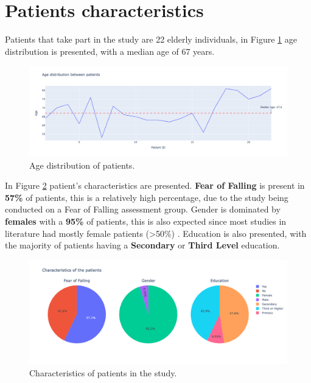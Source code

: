     \section{Patients characteristics}
        Patients that take part in the study are 22 elderly individuals, in Figure \ref{fig:age_distribution} age distribution is presented, with a median age of 67 years. 
        \newpage 
        \begin{figure}[H]
            \centering
            \includegraphics[width=1.0\textwidth]{./resources/plots/patients/age.png}
            \caption{Age distribution of patients.}
            \label{fig:age_distribution}
        \end{figure}

        In Figure \ref{fig:patients_characteristics} patient's characteristics are presented. \textbf{Fear of Falling} is present in \textbf{57\%} of patients, this is a relatively high percentage, due to the study being conducted on a Fear of Falling assessment group. Gender is dominated by \textbf{females} with a \textbf{95\%} of patients, this is also expected since most studies in literature had mostly female patients (>50\%) \cite{mackay_fear_2021}. Education is also presented, with the majority of patients having a \textbf{Secondary} or \textbf{Third Level} education.
        
        \begin{figure}[H]
            \centering
            \includegraphics[width=1.0\textwidth]{./resources/plots/patients/chars.png}
            \caption{Characteristics of patients in the study.}
            \label{fig:patients_characteristics}
        \end{figure}


